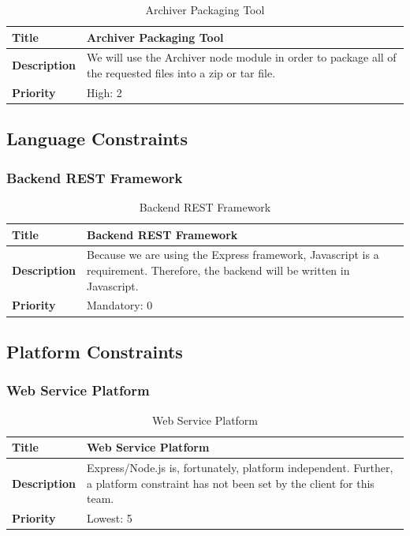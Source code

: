 \documentclass{article}
\begin{document}
\begin{table}[H]
	\caption{Archiver Packaging Tool}
	\begin{tabularx}{\textwidth}{|l|X|}
		\hline
		\textbf{Title}       & Archiver Packaging Tool                  \\ \hline
		\textbf{Description} & We will use the Archiver node module in order to package all of the requested files into a zip or tar file.      \\ \hline
		\textbf{Priority}    & High: 2 \\ \hline
	\end{tabularx}
\end{table}

\subsection{Language Constraints}

\subsubsection{Backend REST Framework}

\begin{table}[H]
	\caption{Backend REST Framework}
	\begin{tabularx}{\textwidth}{|l|X|}
		\hline
		\textbf{Title}       & Backend REST Framework                      \\ \hline
		\textbf{Description} & Because we are using the Express framework,
		Javascript is a requirement. Therefore, the backend will be written
		in Javascript. \\ \hline
		\textbf{Priority}    & Mandatory: 0                                \\ \hline
	\end{tabularx}
\end{table}

\subsection{Platform Constraints}

\subsubsection{Web Service Platform}

\begin{table}[H]
	\caption{Web Service Platform}
	\begin{tabularx}{\textwidth}{|l|X|}
		\hline
		\textbf{Title}       & Web Service Platform                      \\ \hline
		\textbf{Description} & Express/Node.js is, fortunately, platform
		independent. Further, a platform constraint has not been set by the
		client for this team.       \\ \hline
		\textbf{Priority}    & Lowest: 5                                 \\ \hline
	\end{tabularx}
\end{table}
\end{document}

